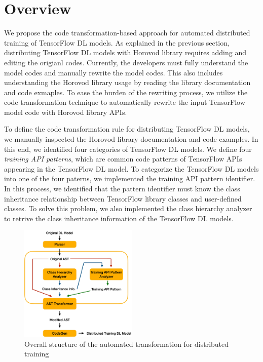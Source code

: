 \section{Overview}
 

We propose the code transformation-based approach 
for automated distributed training of TensorFlow DL models.
As explained in the previous section, distributing TensorFlow DL models
with Horovod library requires adding and editing the origianl codes.
Currently, the developers must fully understand the model codes and
manually rewrite the model codes.
This also includes understanding the Horovod library usage by reading
the library documentation and code exmaples.
To ease the burden of the rewriting process, 
we utilize the code transformation technique to automatically rewrite the
input TensorFlow model code with Horovod library APIs.

To define the code transformation rule for distributing TensorFlow DL models,
we manually inspected the Horovod library documentation and code examples.
In this end, we identified four categories of TensorFlow DL models.
We define four \textit{training API patterns}, which are common code patterns of 
TensorFlow APIs appearing in the TensorFlow DL model.
To categorize the TensorFlow DL models into one of the four paterns, 
we implemented the training API pattern identifier. 
In this process, we identified that the pattern identifier must know the  
class inheritance relationship between TensorFlow library classes and
user-defined classes.
To solve this problem, we also implemented the class hierarchy analyzer to
retrive the class inheritance information of the TensorFlow DL models.

\begin{figure}[ht!]
  \centering
  \includegraphics[width=0.5\textwidth]{tool-arch.pdf}
  \caption{Overall structure of the 
  automated transformation for distributed training}
  \label{sysarch}
\end{figure}

